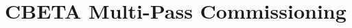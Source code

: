 \documentclass[../main.tex]{subfiles}
\begin{document}
\chapter{CBETA Multi-Pass Commissioning}
\label{ChapterTemplate} %
\end{document}
